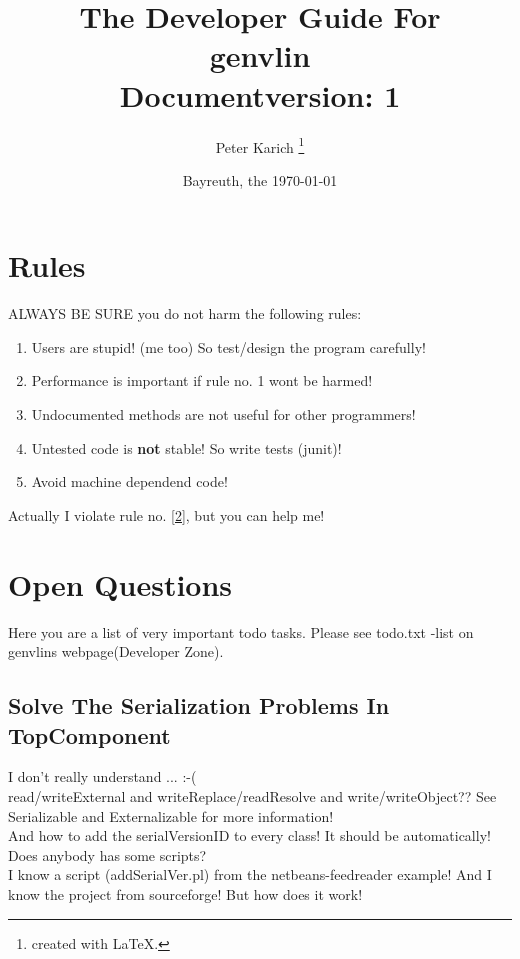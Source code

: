 \documentclass[12pt]{article}
\begin{document}
\addtocounter{footnote}{2}
\pagestyle{empty}
\title{ \bf \LARGE The Developer Guide For \\[1cm] genvlin\\[1cm] Documentversion: 1}
\author{Peter Karich \footnote{created with \LaTeX{}.}}
\date{Bayreuth, the \today}
\maketitle
\newpage
\setcounter{tocdepth}{2}
\tableofcontents
\newpage
\pagestyle{headings}


\section{Rules}
ALWAYS BE SURE you do not harm the following rules:
\begin{enumerate}
\item Users are stupid! (me too) So test/design the program carefully!
\item \label{2} Performance is important if rule no. 1 wont be harmed!
\item Undocumented methods are not useful for other programmers!
\item Untested code is {\bf not} stable! So write tests (junit)!
\item Avoid machine dependend code!
\end{enumerate}
Actually I violate rule no. \ref{2}, but you can help me!
\section{Open Questions}
Here you are a list of very important todo tasks. Please see todo.txt -list on genvlins webpage(Developer Zone).
\subsection{Solve The Serialization Problems In TopComponent}
I don't really understand ... :-(\\
read/writeExternal and writeReplace/readResolve and write/writeObject?? See Serializable and Externalizable for more information!\\
And how to add the serialVersionID to every class! It should be automatically! Does anybody has some scripts?\\
I know a script (addSerialVer.pl) from the netbeans-feedreader example!
And I know the project from sourceforge! But how does it work!\\
\end{document}

